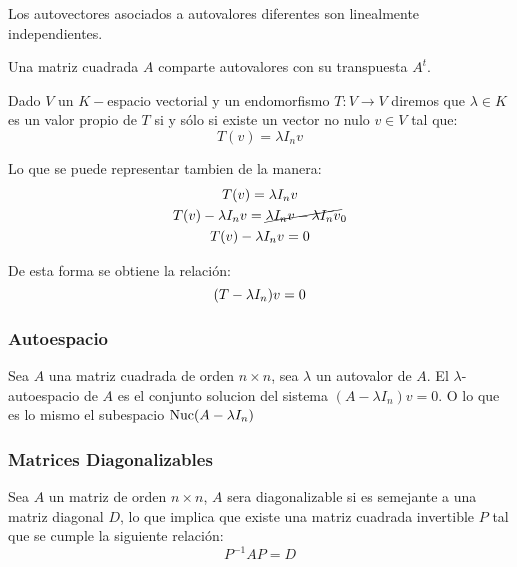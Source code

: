 \begin{prop} \label{autoli}
  Los autovectores asociados a autovalores diferentes son linealmente independientes.
\end{prop}

\begin{prop} \label{autotr}
	Una matriz cuadrada $A$ comparte autovalores con su transpuesta $A^{t}$.
\end{prop}

\begin{prop}\label{mtxeig}
   Dado $V$ un $K-$espacio vectorial y un endomorfismo $T: V \to V $ diremos que $\lambda \in K$ es un valor propio de $T$ si y sólo si existe un vector no nulo $v \in V$ tal que: 
   \[
    T(v) = \lambda I_nv
   \]
\end{prop}

  Lo que se puede representar tambien de la manera:
   \begin{gather*}
       T(v) = \lambda I_nv\\
       T(v) - \lambda I_nv= \cancel{\lambda I_nv - \lambda I_nv}_0\\
       T(v) - \lambda I_nv = 0 \\
   \end{gather*}
   
   De esta forma se obtiene la relación:
   \[
     (T - \lambda I_n)v = 0 \\
   \]


\subsubsection{Autoespacio}
\begin{definition}
  Sea $A$ una matriz cuadrada de orden $n \times n$, sea $\lambda$ un autovalor de $A$. El $\lambda$-autoespacio de $A$ es el conjunto solucion del sistema $(A-\lambda I_n)v = 0$. O lo que es lo mismo el subespacio $\operatorname{Nuc}(A-\lambda I_n)$
\end{definition}

\subsubsection{Matrices Diagonalizables}
\begin{definition}
    Sea $A$ un matriz de orden $n \times n$, $A$ sera diagonalizable si es semejante a una matriz diagonal $D$, lo que implica que existe una matriz cuadrada invertible $P$ tal que se cumple la siguiente relación:
    \[
        P^{-1}AP = D
    \]
\end{definition}


